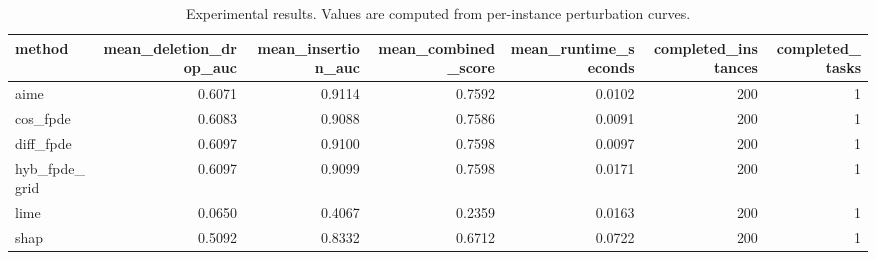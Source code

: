 \begin{table}[t]
\caption{Experimental results. Values are computed from per-instance perturbation curves.}
\label{tab:main_results_computed}
\centering
\begin{tabular}{lrrrrrr}
\toprule
method & mean\_deletion\_drop\_auc & mean\_insertion\_auc & mean\_combined\_score & mean\_runtime\_seconds & completed\_instances & completed\_tasks \\
\midrule
aime & 0.6071 & 0.9114 & 0.7592 & 0.0102 & 200 & 1 \\
cos\_fpde & 0.6083 & 0.9088 & 0.7586 & 0.0091 & 200 & 1 \\
diff\_fpde & 0.6097 & 0.9100 & 0.7598 & 0.0097 & 200 & 1 \\
hyb\_fpde\_grid & 0.6097 & 0.9099 & 0.7598 & 0.0171 & 200 & 1 \\
lime & 0.0650 & 0.4067 & 0.2359 & 0.0163 & 200 & 1 \\
shap & 0.5092 & 0.8332 & 0.6712 & 0.0722 & 200 & 1 \\
\bottomrule
\end{tabular}

\end{table}
